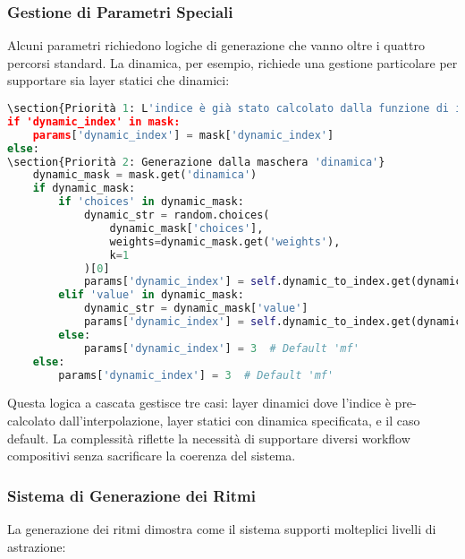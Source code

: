 \subsubsection{Gestione di Parametri Speciali}
Alcuni parametri richiedono logiche di generazione che vanno oltre i quattro percorsi standard. La dinamica, per esempio, richiede una gestione particolare per supportare sia layer statici che dinamici:

\begin{lstlisting}[language=Python]
\section{Priorità 1: L'indice è già stato calcolato dalla funzione di interpolazione}
if 'dynamic_index' in mask:
    params['dynamic_index'] = mask['dynamic_index']
else:
\section{Priorità 2: Generazione dalla maschera 'dinamica'}
    dynamic_mask = mask.get('dinamica')
    if dynamic_mask:
        if 'choices' in dynamic_mask:
            dynamic_str = random.choices(
                dynamic_mask['choices'], 
                weights=dynamic_mask.get('weights'), 
                k=1
            )[0]
            params['dynamic_index'] = self.dynamic_to_index.get(dynamic_str, 3)
        elif 'value' in dynamic_mask:
            dynamic_str = dynamic_mask['value']
            params['dynamic_index'] = self.dynamic_to_index.get(dynamic_str, 3)
        else:
            params['dynamic_index'] = 3  # Default 'mf'
    else:
        params['dynamic_index'] = 3  # Default 'mf'
\end{lstlisting}

Questa logica a cascata gestisce tre casi: layer dinamici dove l'indice è pre-calcolato dall'interpolazione, layer statici con dinamica specificata, e il caso default. La complessità riflette la necessità di supportare diversi workflow compositivi senza sacrificare la coerenza del sistema.
\subsubsection{Sistema di Generazione dei Ritmi}
La generazione dei ritmi dimostra come il sistema supporti molteplici livelli di astrazione:

